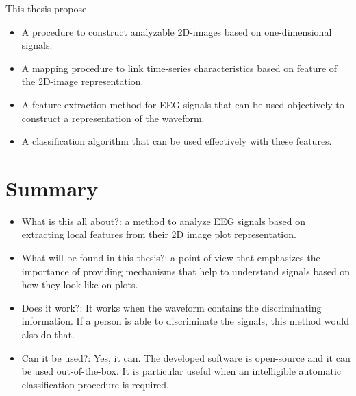 This thesis propose

\begin{itemize}
\item A procedure to construct analyzable 2D-images based on one-dimensional signals.
\item A mapping procedure to link time-series characteristics based on feature of the 2D-image representation.
\item A feature extraction method for EEG signals that can be used objectively to construct a representation of the waveform.
\item A classification algorithm that can be used effectively with these features.
\end{itemize}

\section{Summary}

\begin{itemize}
\item What is this all about?: a method to analyze EEG signals based on extracting local features from their 2D image plot representation.
\item What will be found in this thesis?: a point of view that emphasizes the importance of providing mechanisms that help to understand signals based on how they look like on plots.
\item Does it work?: It works when the waveform contains the discriminating information.  If a person is able to discriminate the signals, this method would also do that.
\item Can it be used?:  Yes, it can.  The developed software is open-source and it can be used out-of-the-box.  It is particular useful when an intelligible automatic classification procedure is required.
\end{itemize}


